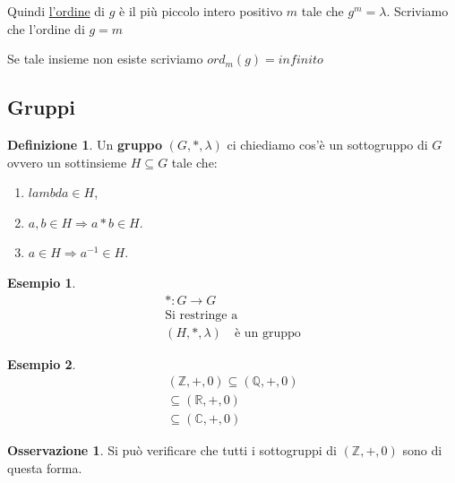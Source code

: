\documentclass{article}
\newtheorem{exmp}{Esempio}[section]
\theoremstyle{definition}
\newtheorem{definition}{Definizione}[section]
\newtheorem{oss}{Osservazione}[section]
\begin{document}
Quindi \underline{l'ordine} di $g$ è il più piccolo intero positivo $m$ tale che $ g^m = \lambda $.
Scriviamo che l'ordine di $g = m$ \par
Se tale insieme non esiste scriviamo $ ord_m(g) = infinito $



\subsection{Gruppi}\label{sec:gruppi}
\begin{definition}
       Un \textbf{gruppo} $ (G, *, \lambda) $ ci chiediamo cos'è un sottogruppo di $ G $ ovvero un sottinsieme $ H \subseteq G $ tale che:
       \begin{enumerate}
               \item $ lambda \in H $,
               \item $ a,b \in H \Rightarrow a*b \in H $.
               \item $ a \in H \Rightarrow a^{-1} \in H $.
       \end{enumerate}
\end{definition}

\begin{exmp}
        \begin{align*}
                * : G \to G \\
                \mbox{Si restringe a} \\
                (H, *, \lambda) \quad \mbox{è un gruppo}
        \end{align*}
\end{exmp}
\begin{exmp}
        \begin{align*}
                (\mathbb{Z}, +, 0) \subseteq (\mathbb{Q}, +, 0) \\
                \subseteq (\mathbb{R}, +, 0) \\
                \subseteq (\mathbb{C}, +, 0)
        \end{align*}
\end{exmp}


\begin{tcolorbox}
\begin{oss}
       Si può verificare che tutti i sottogruppi di $ (\mathbb{Z}, +, 0) $ sono di questa forma. 
\end{oss}
\end{tcolorbox}
\end{document}
